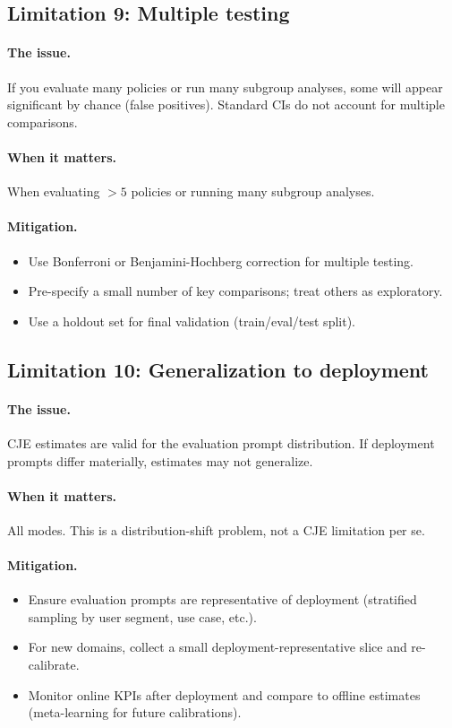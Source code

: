 \subsection{Limitation 9: Multiple testing}

\paragraph{The issue.} If you evaluate many policies or run many subgroup analyses, some will appear significant by chance (false positives). Standard CIs do not account for multiple comparisons.

\paragraph{When it matters.} When evaluating $> 5$ policies or running many subgroup analyses.

\paragraph{Mitigation.}
\begin{itemize}
\item Use Bonferroni or Benjamini-Hochberg correction for multiple testing.
\item Pre-specify a small number of key comparisons; treat others as exploratory.
\item Use a holdout set for final validation (train/eval/test split).
\end{itemize}

\subsection{Limitation 10: Generalization to deployment}

\paragraph{The issue.} CJE estimates are valid for the evaluation prompt distribution. If deployment prompts differ materially, estimates may not generalize.

\paragraph{When it matters.} All modes. This is a distribution-shift problem, not a CJE limitation per se.

\paragraph{Mitigation.}
\begin{itemize}
\item Ensure evaluation prompts are representative of deployment (stratified sampling by user segment, use case, etc.).
\item For new domains, collect a small deployment-representative slice and re-calibrate.
\item Monitor online KPIs after deployment and compare to offline estimates (meta-learning for future calibrations).
\end{itemize}

